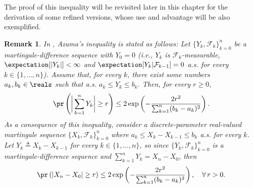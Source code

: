 \documentclass{article}
\theoremstyle{plain}
\newtheorem{remark}[theorem]{Remark}
\begin{document}
The proof of this inequality will be revisited later
in this chapter for the derivation of some refined versions,
whose use and advantage will be also exemplified.

\begin{remark}
In \cite[Theorem~3.13]{McDiarmid_tutorial}, Azuma's inequality is
stated as follows: Let $\{Y_k, \mathcal{F}_k\}_{k=0}^n$ be a
martingale-difference sequence with $Y_0=0$ (i.e., $Y_k$ is
$\mathcal{F}_k$-measurable, $\expectation[|Y_k|] < \infty$ and
$\expectation[Y_k| \mathcal{F}_{k-1}]=0$ a.s. for every $k \in
\{1, \ldots, n\}$). Assume that, for every $k$, there
exist some numbers $a_k, b_k \in \reals$ such that a.s.
$a_k \leq Y_k \leq b_k$. Then, for every $r \geq 0$,
\begin{equation}
\pr \left( \bigg|\sum_{k=1}^n Y_k\bigg| \geq r \right) \leq 2
\exp\left(-\frac{2r^2}{\sum_{k=1}^n (b_k-a_k)^2} \right).
\label{eq: concentration inequality for a martingale-difference
sequence (McDiarmid's tutorial)}
\end{equation}
As a consequence of this inequality, consider a discrete-parameter
real-valued martingale sequence $\{X_k, \mathcal{F}_k\}_{k=0}^n$
where $a_k \leq X_k - X_{k-1} \leq b_k$ a.s. for every $k$. Let $Y_k
\triangleq X_k - X_{k-1}$ for every $k \in \{1, \ldots, n\}$, so
since $\{Y_k, \mathcal{F}_k\}_{k=0}^n$ is a
martingale-difference sequence and $\sum_{k=1}^n Y_k = X_n - X_0$, then
\begin{equation}
\pr \left( |X_n - X_0| \geq r \right) \leq 2
\exp\left(-\frac{2r^2}{\sum_{k=1}^n (b_k-a_k)^2} \right), \quad \forall \, r > 0.
\label{eq: concentration inequality for a martingale sequence
(McDiarmid's tutorial)}
\end{equation}
\end{remark}
\end{document}
